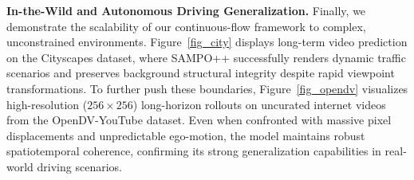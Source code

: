 \textbf{In-the-Wild and Autonomous Driving Generalization.} Finally, we demonstrate the scalability of our continuous-flow framework to complex, unconstrained environments. Figure~\ref{fig_city} displays long-term video prediction on the Cityscapes dataset, where SAMPO++ successfully renders dynamic traffic scenarios and preserves background structural integrity despite rapid viewpoint transformations. To further push these boundaries, Figure~\ref{fig_opendv} visualizes high-resolution ($256 \times 256$) long-horizon rollouts on uncurated internet videos from the OpenDV-YouTube dataset. Even when confronted with massive pixel displacements and unpredictable ego-motion, the model maintains robust spatiotemporal coherence, confirming its strong generalization capabilities in real-world driving scenarios.
